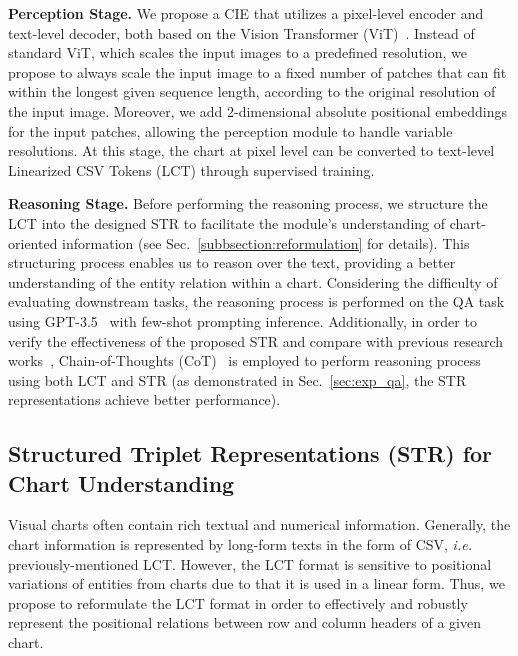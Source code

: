 \documentclass{article} \usepackage{iclr2024_conference,times}
\begin{document}
\noindent\textbf{Perception Stage.}
We propose a CIE that utilizes a pixel-level encoder and text-level decoder, both based on the Vision Transformer (ViT)~\citep{Dosovitskiy2020AnII}. Instead of standard ViT, which scales the input images to a predefined resolution, we propose to always scale the input image to a fixed number of patches that can fit within the longest given sequence length, according to the original resolution of the input image. Moreover, we add 2-dimensional absolute positional embeddings for the input patches, allowing the perception module to handle variable resolutions. At this stage, the chart at pixel level can be converted to text-level Linearized CSV Tokens (LCT) through supervised training.

\noindent\textbf{Reasoning Stage.}
\label{sec:structchart model}
Before performing the reasoning process, we structure the LCT into the designed STR to facilitate the module's understanding of chart-oriented information (see Sec.~\ref{subbsection:reformulation} for details). This structuring process enables us to reason over the text, providing a better understanding of the entity relation within a chart. Considering the difficulty of evaluating downstream tasks, the reasoning process is performed on the QA task using GPT-3.5~\citep{Brown2020gpt} with few-shot prompting inference. Additionally, in order to verify the effectiveness of the proposed STR and compare with previous research works~\citep{Luo2021ChartOCRDE,Masry2022ChartQAAB,Liu2022DePlotOV,Liu2022MatChaEV}, Chain-of-Thoughts (CoT)~\citep{Wei2022ChainOT} is employed to perform reasoning process using both LCT and STR (as demonstrated in Sec.~\ref{sec:exp_qa}, the STR representations achieve better performance).


\vspace{-8pt}
\subsection{Structured Triplet Representations (STR) for Chart Understanding}
\vspace{-8pt}
\label{subbsection:reformulation}
Visual charts often contain rich textual and numerical information. Generally, the chart information is represented by long-form texts in the form of CSV, \textit{i.e.} previously-mentioned LCT. However, the LCT format is sensitive to positional variations of entities from charts due to that it is used in a linear form. 
Thus, we propose to reformulate the LCT format in order to effectively and robustly represent the positional relations between row and column headers of a given chart.
\end{document}
